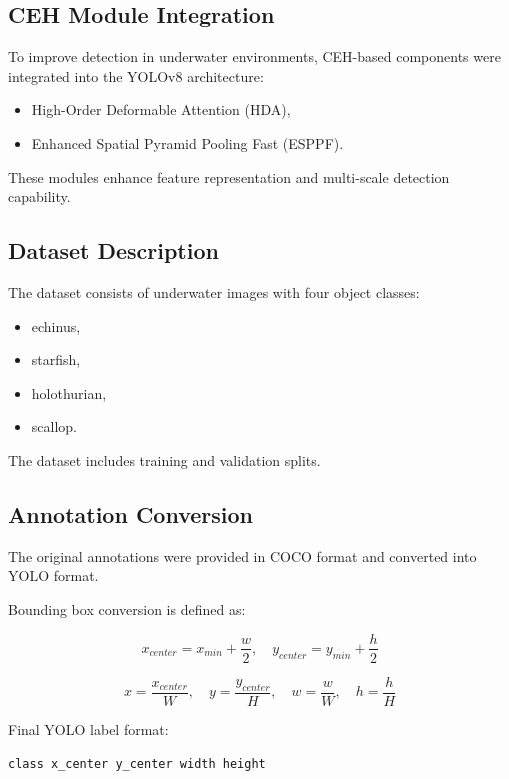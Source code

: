 \documentclass[12pt]{article}
\begin{document}
\subsection{CEH Module Integration}

To improve detection in underwater environments, CEH-based components were integrated into the YOLOv8 architecture:
\begin{itemize}
    \item High-Order Deformable Attention (HDA),
    \item Enhanced Spatial Pyramid Pooling Fast (ESPPF).
\end{itemize}

These modules enhance feature representation and multi-scale detection capability.

\subsection{Dataset Description}

The dataset consists of underwater images with four object classes:
\begin{itemize}
    \item echinus,
    \item starfish,
    \item holothurian,
    \item scallop.
\end{itemize}

The dataset includes training and validation splits.

\subsection{Annotation Conversion}

The original annotations were provided in COCO format and converted into YOLO format.

Bounding box conversion is defined as:

\begin{equation}
x_{center} = x_{min} + \frac{w}{2}, \quad
y_{center} = y_{min} + \frac{h}{2}
\end{equation}

\begin{equation}
x = \frac{x_{center}}{W}, \quad
y = \frac{y_{center}}{H}, \quad
w = \frac{w}{W}, \quad
h = \frac{h}{H}
\end{equation}

Final YOLO label format:
\begin{center}
\texttt{class x\_center y\_center width height}
\end{center}
\end{document}
